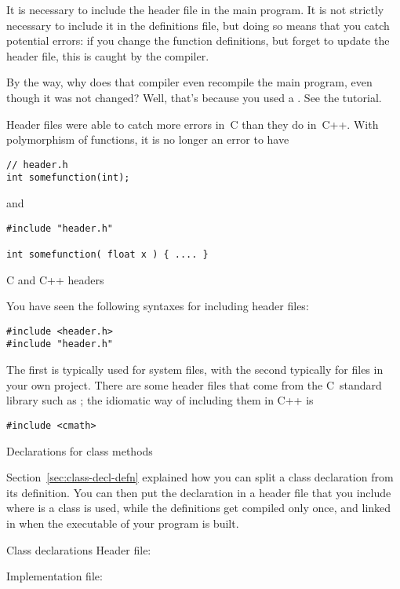 It is necessary to include the header file in the main program. It is
not strictly necessary to include it in the definitions file, but
doing so means that you catch potential errors: if you change the
function definitions, but forget to update the header file, this is
caught by the compiler.

\begin{remark}
  By the way, why does that compiler even recompile the main program,
  even though it was not changed? Well, that's because you used a
  . See the tutorial.
\end{remark}
\begin{remark}
  Header files were able to catch more errors in~C than they do
  in~C++. With polymorphism of functions, it is no longer an error to
  have 
\begin{lstlisting}
// header.h
int somefunction(int);
\end{lstlisting}
and
\begin{lstlisting}
#include "header.h"

int somefunction( float x ) { .... }
\end{lstlisting}
\end{remark}

 {C and C++ headers}

You have seen the following syntaxes for including header files:
\begin{lstlisting}
#include <header.h>
#include "header.h"
\end{lstlisting}
The first is typically used for system files, with the second
typically for files in your own project. There are some header files
that come from the C~standard library such as ; the
idiomatic way of including them in C++ is
\begin{lstlisting}
#include <cmath>
\end{lstlisting}

 {Declarations for class methods}
\label{sec:class-header-file}

Section~\ref{sec:class-decl-defn} explained how you can split a
class declaration from its definition.
You can then put the declaration in a header file that
you include where is a class is used,
while the definitions get compiled only once,
and linked in when the executable of your program is built.

\begin{block}{Class declarations}
  \label{sl:class-proto}
  Header file:

  Implementation file:
\end{block}

